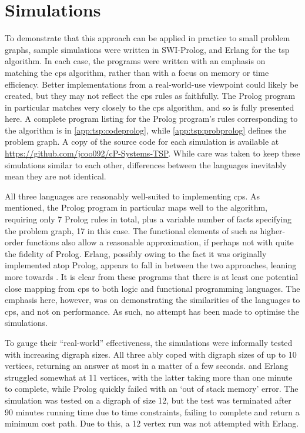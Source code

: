\section{\label{sec:tsp:simulation}Simulations}
To demonstrate that this approach can be applied in practice to small problem graphs, sample simulations were written in SWI-Prolog, \fsharp{} and Erlang for the \gls{tsp} algorithm.  In each case, the programs were written with an emphasis on matching the \gls{cps} algorithm, rather than with a focus on memory or time efficiency.  Better implementations from a real-world-use viewpoint could likely be created, but they may not reflect the \gls{cps} rules as faithfully.  The Prolog program in particular matches very closely to the \gls{cps} algorithm, and so is fully presented here.  A complete program listing for the Prolog program's rules corresponding to the algorithm is in \cref{app:tsp:codeprolog}, while \cref{app:tsp:probprolog} defines the problem graph.  A copy of the source code for each simulation is available at \url{https://github.com/jcoo092/cP-Systems-TSP}.  While care was taken to keep these simulations similar to each other, differences between the languages inevitably mean they are not identical.

All three languages are reasonably well-suited to implementing \gls{cps}.  As mentioned, the Prolog program in particular maps well to the algorithm, requiring only 7 Prolog rules in total, plus a variable number of facts specifying the problem graph, 17 in this case.  The functional elements of \fsharp{} such as higher-order functions also allow a reasonable approximation, if perhaps not with quite the fidelity of Prolog.  Erlang, possibly owing to the fact it was originally implemented atop Prolog, appears to fall in between the two approaches, leaning more towards \fsharp{}.  It is clear from these programs that there is at least one potential close mapping from \gls{cps} to both logic and functional programming languages.  The emphasis here, however, was on demonstrating the similarities of the languages to \gls{cps}, and not on performance.  As such, no attempt has been made to optimise the simulations.

To gauge their ``real-world'' effectiveness, the simulations were informally tested with increasing digraph sizes.  All three ably coped with digraph sizes of up to 10 vertices, returning an answer at most in a matter of a few seconds.  \fsharp{} and Erlang struggled somewhat at 11 vertices, with the latter taking more than one minute to complete, while Prolog quickly failed with an `out of stack memory' error.  The \fsharp{} simulation was tested on a digraph of size 12, but the test was terminated after 90 minutes running time due to time constraints, failing to complete and return a minimum cost path.  Due to this, a 12 vertex run was not attempted with Erlang.

